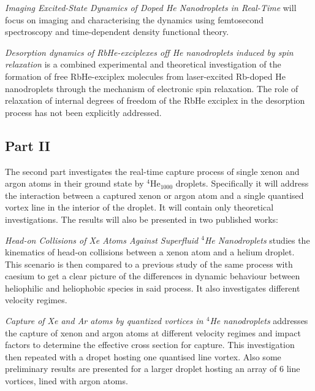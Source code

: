 \documentclass[11pt,a4paper,twoside]{article}
\begin{document}
			\emph{Imaging Excited-State Dynamics of Doped He Nanodroplets in Real-Time} will focus on imaging and characterising the dynamics using femtosecond spectroscopy and  time-dependent density functional theory.
		
			\emph{Desorption dynamics of RbHe-exciplexes off He nanodroplets induced by spin relaxation} is a combined experimental and theoretical investigation of the formation of free RbHe-exciplex molecules from laser-excited Rb-doped He nanodroplets through the mechanism of electronic spin relaxation. The role of relaxation of internal degrees of freedom of the RbHe exciplex in the desorption process has not been explicitly addressed.

		\subsection{Part II}
			The second part investigates the real-time capture process of single xenon and argon atoms in their ground state by $^4$He$_{1000}$ droplets. Specifically it will address the interaction between a captured xenon or argon atom and a single quantised vortex line in the interior of the droplet. It will contain only theoretical investigations. The results will also be presented in two published works:
		
			\emph{Head-on Collisions of Xe Atoms Against Superfluid $^4\!$He Nanodroplets} studies the kinematics of head-on collisions between a xenon atom and a helium droplet. This scenario is then compared to a previous study of the same process with caesium to get a clear picture of the differences in dynamic behaviour between heliophilic and heliophobic species in said process. It also investigates different velocity regimes.
		
			\emph{Capture of Xe and Ar atoms by quantized vortices in $^4\!$He nanodroplets} addresses the capture of xenon and argon atoms at different velocity regimes and impact factors to determine the effective cross section for capture. This investigation then repeated with a dropet hosting one quantised line vortex. Also some preliminary results are presented for a larger droplet hosting an array of 6 line vortices, lined with argon atoms.
			

\end{document}
